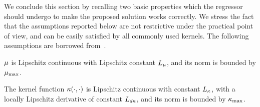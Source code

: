 We conclude this section by recalling two basic properties which the regressor should undergo to make the proposed solution works 
correctly. We stress the fact that the assumptions reported below are not restrictive under the practical point of view, and can be
easily satisfied by all commonly used kernels. The following assumptions are borrowed from~\cite{buisson2021joint}.
\begin{assumption}%
    $\mu$ is Lipschitz continuous with Lipschitz constant $L_{\mu}$, and its norm is bounded by $\mu_{\text{max}}$.
 \end{assumption}
 \begin{assumption}%
    The kernel function $\kappa(\cdot, \cdot)$ is Lipschitz continuous with constant $L_{\kappa}$, with a locally Lipschitz derivative of constant $L_{d\kappa}$,
    and its norm is bounded by $\kappa_{\text{max}}$.
 \end{assumption}

